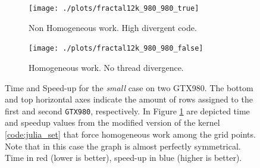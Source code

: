 \begin{figure}
	\begin{subfigure}{1.0\textwidth}
		\caption{Non Homogeneous work. High divergent code.}
		\texttt{[image: ./plots/fractal12k\_980\_980\_true]}
		\label{fig:fractal12k_980_980_false}
	\end{subfigure}		
	\endminipage \hfill
	 \vspace{5mm}
	\begin{subfigure}{1.0\textwidth}
		\caption{Homogeneous work. No thread divergence.}
		\texttt{[image: ./plots/fractal12k\_980\_980\_false]}

\label{fig:fractal12k_980_980_true}
	\end{subfigure}
	\endminipage\hfill
	\caption[Time and Speed-up for the \textit{small} case on two GTX980.]{Time and Speed-up for the \textit{small} case on two GTX980. The bottom and top horizontal axes indicate the amount of rows assigned to the first and second \texttt{GTX980}, respectively. In Figure \ref{fig:fractal12k_980_980_false} are depicted time and speedup values from the modified version of the kernel \ref{code:julia_set} that force homogeneous work among the grid points. Note that in this case the graph is almost perfectly symmetrical. Time in red (lower is better), speed-up in blue (higher is better).}
	\label{fig:fractal12k_980_980}
\end{figure}


